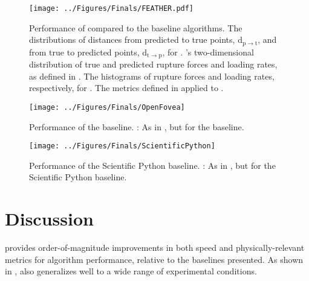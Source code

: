 \begin{figure}[htpb]
\caption[\name{} Performance]{\noindent{}Performance of \name{} compared to the baseline algorithms.  The distributions of distances from predicted to true points, d$_{\mathrm{p}\rightarrow\mathrm{t}}$, and from true to predicted points, d$_{\mathrm{t}\rightarrow\mathrm{p}}$, for \name{}.  \name{}'s two-dimensional distribution of true and predicted rupture forces and loading rates, as defined in .  The histograms of rupture forces and loading rates, respectively, for \name{}.   The metrics defined in  applied to \name{}. }
\centering
\texttt{[image: ../Figures/Finals/FEATHER.pdf]}%
\end{figure}

\begin{figure}[htpb]
\caption[\OpenFovea{} Performance]{\noindent{}Performance of the \OpenFovea{} baseline. : As in , but for the \OpenFovea{} baseline.}
\centering
\texttt{[image: ../Figures/Finals/OpenFovea]}%
\end{figure}



\begin{figure}[htpb]
\caption[Scientific Python Performance]{\noindent{}Performance of the Scientific Python baseline. : As in , but for the Scientific Python baseline. }
\centering
\texttt{[image: ../Figures/Finals/ScientificPython]}%
\end{figure}


\chapter{Discussion}


 \name{} provides order-of-magnitude improvements in both speed and physically-relevant metrics for algorithm performance, relative to the baselines presented. As shown in , \name{} also generalizes well to a wide range of \singlemol{} experimental conditions.  

